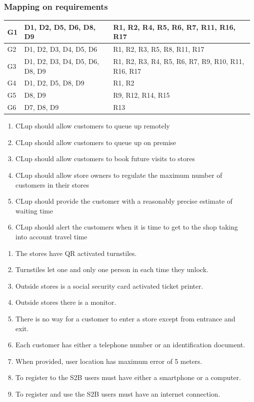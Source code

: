 \subsubsection{Mapping on requirements}
\begin{tabular}{ | m{3cm} | m{5cm} | m{9cm} | }
	\hline
	G1 & D1, D2, D5, D6, D8, D9 & R1, R2, R4, R5, R6, R7, R11, R16, R17\\
	\hline
	G2 & D1, D2, D3, D4, D5, D6 & R1, R2, R3, R5, R8, R11, R17\\
	\hline
	G3 & D1, D2, D3, D4, D5, D6, D8, D9 & R1, R2, R3, R4, R5, R6, R7, R9, R10, R11, R16, R17\\
	\hline
	G4 & D1, D2, D5, D8, D9 & R1, R2 \\
	\hline
	G5 & D8, D9 & R9, R12, R14, R15\\
	\hline
	G6 & D7, D8, D9 & R13\\
	\hline

\end{tabular}
\begin{enumerate}[label=G\arabic*]
	\item CLup should allow customers to queue up remotely
	\item CLup should allow customers to queue up on premise
	\item CLup should allow customers to book future visits to stores
	\item CLup should allow store owners to regulate the maximum number of customers in their stores
	\item CLup should provide the customer with a reasonably precise estimate of waiting time
	\item CLup should alert the customers when it is time to get to the shop taking into account travel time
\end{enumerate}
\begin{enumerate}[label=D\arabic*]
	\item The stores have QR activated turnstiles.
	\item Turnstiles let one and only one person in each time they unlock.
	\item Outside stores is a social security card activated ticket printer.
	\item Outside stores there is a monitor.
	\item There is no way for a customer to enter a store except from entrance and exit.
	\item Each customer has either a telephone number or an identification document.
	\item When provided, user location has maximum error of 5 meters.
	\item To register to the S2B users must have either a smartphone or a computer.
	\item To register and use the S2B users must have an internet connection.
\end{enumerate}
